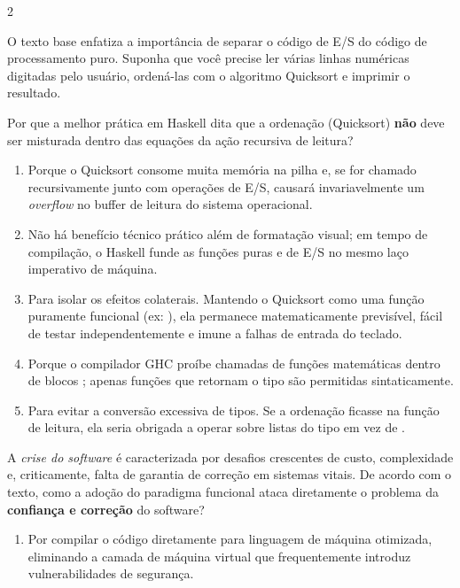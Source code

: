 \documentclass[a4paper,10pt,brazil]{article}
\begin{document}
\begin{multicols}{2}
\begin{enumerate}
\end{enumerate}

O texto base enfatiza a importância de separar o código de E/S do código de processamento puro. Suponha que você precise ler várias linhas numéricas digitadas pelo usuário, ordená-las com o algoritmo Quicksort e imprimir o resultado. 

Por que a melhor prática em Haskell dita que a ordenação (Quicksort) \textbf{não} deve ser misturada dentro das equações da ação recursiva de leitura?

\begin{enumerate}
  \item Porque o Quicksort consome muita memória na pilha e, se for chamado recursivamente junto com operações de E/S, causará invariavelmente um \emph{overflow} no buffer de leitura do sistema operacional.

  \item Não há benefício técnico prático além de formatação visual; em tempo de compilação, o Haskell funde as funções puras e de E/S no mesmo laço imperativo de máquina.

  \item Para isolar os efeitos colaterais. Mantendo o Quicksort como uma função puramente funcional (ex: \haskellinline{[Int] -> [Int]}), ela permanece matematicamente previsível, fácil de testar independentemente e imune a falhas de entrada do teclado.

  \item Porque o compilador GHC proíbe chamadas de funções matemáticas dentro de blocos ; apenas funções que retornam o tipo  são permitidas sintaticamente.

  \item Para evitar a conversão excessiva de tipos. Se a ordenação ficasse na função de leitura, ela seria obrigada a operar sobre listas do tipo \haskellinline{[IO Int]} em vez de \haskellinline{[Int]}.


\end{enumerate}

A \emph{crise do software} é caracterizada por desafios crescentes de custo, complexidade e, criticamente, falta de garantia de correção em sistemas vitais. De acordo com o texto, como a adoção do paradigma funcional ataca diretamente o problema da \textbf{confiança e correção} do software?

\begin{enumerate}
  \item Por compilar o código diretamente para linguagem de máquina otimizada, eliminando a camada de máquina virtual que frequentemente introduz vulnerabilidades de segurança.


\end{enumerate}
\end{multicols}
\end{document}
